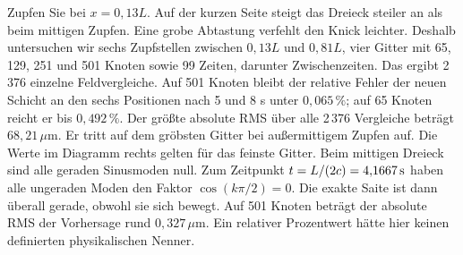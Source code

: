 Zupfen Sie bei \(x=0{,}13L\). Auf der kurzen Seite steigt das Dreieck steiler an als beim mittigen Zupfen. Eine grobe Abtastung verfehlt den Knick leichter. Deshalb untersuchen wir sechs Zupfstellen zwischen \(0{,}13L\) und \(0{,}81L\), vier Gitter mit 65, 129, 251 und 501 Knoten sowie 99 Zeiten, darunter Zwischenzeiten. Das ergibt 2\,376 einzelne Feldvergleiche.
Auf 501 Knoten bleibt der relative Fehler der neuen Schicht an den sechs Positionen nach 5 und 8 s unter \(0{,}065\,\%\); auf 65 Knoten reicht er bis \(0{,}492\,\%\). Der größte absolute RMS über alle 2\,376 Vergleiche beträgt \(68{,}21\,\mu\mathrm m\). Er tritt auf dem gröbsten Gitter bei außermittigem Zupfen auf. Die Werte im Diagramm rechts gelten für das feinste Gitter.
Beim mittigen Dreieck sind alle geraden Sinusmoden null. Zum Zeitpunkt \(t=L/(2c)=4{,}1667\,\mathrm{s}\) haben alle ungeraden Moden den Faktor \(\cos(k\pi/2)=0\). Die exakte Saite ist dann überall gerade, obwohl sie sich bewegt. Auf 501 Knoten beträgt der absolute RMS der Vorhersage rund \(0{,}327\,\mu\mathrm m\). Ein relativer Prozentwert hätte hier keinen definierten physikalischen Nenner.

